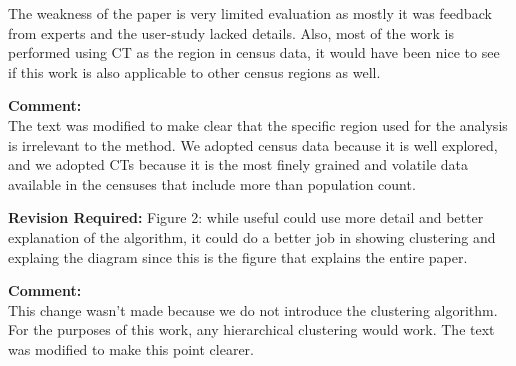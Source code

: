 \documentclass{article}
\newcommand{\reply}[1]{\begin{tcolorbox}\noindent\textbf{Comment:}\\#1\hfill\end{tcolorbox}}
\begin{document}
\begin{itemize}
{    The weakness of the paper is very limited evaluation as mostly it was feedback
    from experts and the user-study lacked details. Also, most of the work is
    performed using CT as the region in census data, it would have been nice to see if
    this work is also applicable to other census regions as well.

    \reply{The text was modified to make clear that the specific region used for
    the analysis is irrelevant to the method. We adopted census data because it
    is well explored, and we adopted CTs because it is the most finely grained
    and volatile data available in the censuses that include more than
    population count.}

    \textbf{Revision Required:}
    Figure 2: while useful could use more detail and better explanation of the
    algorithm, it could do a better job in showing clustering and explaing the diagram
    since this is the figure that explains the entire paper.

    \reply{This change wasn't made because we do not introduce the clustering
    algorithm. For the purposes of this work, any hierarchical clustering would
    work. The text was modified to make this point clearer.}}
\end{itemize}
\end{document}
